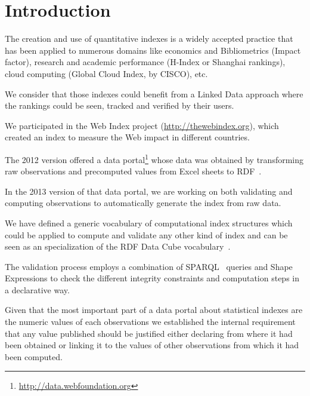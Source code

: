 \documentclass{acm_proc_article-sp}
\newcommand{\footnoteUrl}[1]{\footnote{\url{#1}}}
\begin{document}



\section{Introduction}

The creation and use of quantitative indexes is a widely 
accepted practice that has been applied to numerous domains like economics and
Bibliometrics (Impact factor), 
research and academic performance (H-Index or Shanghai rankings), 
 cloud computing (Global Cloud Index, by CISCO), 
etc.

We consider that those indexes could benefit from a 
 Linked Data approach where the rankings could be seen, tracked and 
 verified by their users.

We participated in the Web Index project
(\url{http://thewebindex.org}), which created an index to measure the Web impact in different countries.

The 2012 version offered a data
portal\footnoteUrl{http://data.webfoundation.org} whose data was obtained 
by transforming raw observations and precomputed values 
from Excel sheets to RDF~\cite{Alvarez13}. 

In the 2013 version of that data portal, we are working on 
both validating and computing observations to automatically generate the index from raw data.

We have defined a generic vocabulary 
of computational index structures which could be applied to compute and validate any other kind of index and can be seen as an specialization of the RDF Data Cube vocabulary~\cite{Cube}.

The validation process employs a combination of SPARQL~\cite{SPARQL11} queries and Shape Expressions \cite{Boneva2014} to check the 
 different integrity constraints and computation steps in a declarative way.

Given that the most important part of a data portal about statistical indexes are the 
numeric values of each observations we established the internal requirement that any value published should be justified either declaring from where it had been obtained or
linking it to the values of other observations
from which it had been computed.
\end{document}

